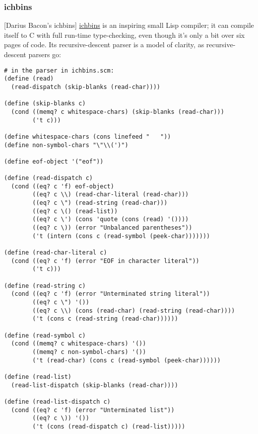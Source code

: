 \documentclass[
]{article}
\begin{document}
\hypertarget{ichbins}{%
\subsubsection{ichbins}\label{ichbins}}

{[}Darius Bacon's ichbins{]}
\href{http://www.accesscom.com/~darius/???XXX}{ichbins} is an inspiring
small Lisp compiler; it can compile itself to C with full run-time
type-checking, even though it's only a bit over six pages of code. Its
recursive-descent parser is a model of clarity, as recursive-descent
parsers go:

\begin{verbatim}
# in the parser in ichbins.scm:
(define (read)
  (read-dispatch (skip-blanks (read-char))))

(define (skip-blanks c)
  (cond ((memq? c whitespace-chars) (skip-blanks (read-char)))
        ('t c)))

(define whitespace-chars (cons linefeed "   "))
(define non-symbol-chars "\"\\(')")

(define eof-object '("eof"))

(define (read-dispatch c)
  (cond ((eq? c 'f) eof-object)
        ((eq? c \\) (read-char-literal (read-char)))
        ((eq? c \") (read-string (read-char)))
        ((eq? c \() (read-list))
        ((eq? c \') (cons 'quote (cons (read) '())))
        ((eq? c \)) (error "Unbalanced parentheses"))
        ('t (intern (cons c (read-symbol (peek-char)))))))

(define (read-char-literal c)
  (cond ((eq? c 'f) (error "EOF in character literal"))
        ('t c)))

(define (read-string c)
  (cond ((eq? c 'f) (error "Unterminated string literal"))
        ((eq? c \") '())
        ((eq? c \\) (cons (read-char) (read-string (read-char))))
        ('t (cons c (read-string (read-char))))))

(define (read-symbol c)
  (cond ((memq? c whitespace-chars) '())
        ((memq? c non-symbol-chars) '())
        ('t (read-char) (cons c (read-symbol (peek-char))))))

(define (read-list)
  (read-list-dispatch (skip-blanks (read-char))))

(define (read-list-dispatch c)
  (cond ((eq? c 'f) (error "Unterminated list"))
        ((eq? c \)) '())
        ('t (cons (read-dispatch c) (read-list)))))
\end{verbatim}
\end{document}
